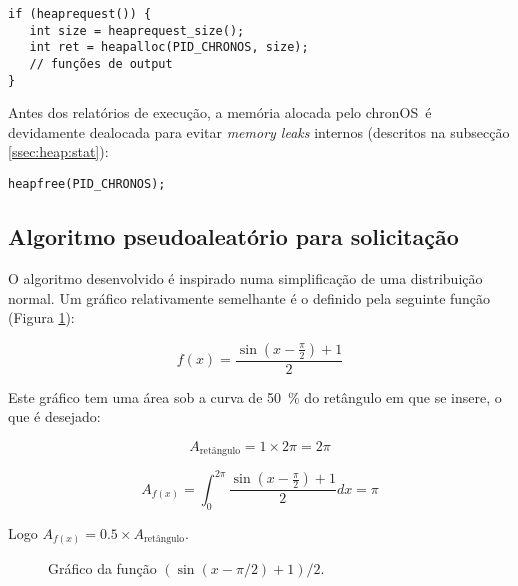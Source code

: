 \documentclass[10pt,oneside]{estiloUBI}
\newcommand{\chronOS}{\textsf{chronOS}}
\begin{document}
	\begin{verbatim}
if (heaprequest()) {
   int size = heaprequest_size();
   int ret = heapalloc(PID_CHRONOS, size);
   // funções de output
}
	\end{verbatim}
	
	Antes dos relatórios de execução, a memória alocada pelo \chronOS~é devidamente dealocada para evitar \textit{memory leaks} internos (descritos na subsecção \ref{ssec:heap:stat}):
	
	\begin{verbatim}
heapfree(PID_CHRONOS);
	\end{verbatim}
	
	
	\subsection{Algoritmo pseudoaleatório para solicitação}
	\label{sssec:heap:request:alg}
	
	O algoritmo desenvolvido é inspirado numa simplificação de uma distribuição normal. Um gráfico relativamente semelhante é o definido pela seguinte função (Figura \ref{graph:heap:request:alg}):
	
	\begin{equation}
f(x) = \frac{\sin\left(x - \frac{\pi}{2}\right) + 1}{2}
	\end{equation}
	
	Este gráfico tem uma área sob a curva de \SI{50}{\percent} do retângulo em que se insere, o que é desejado:
	
	\begin{displaymath}
		A_{\textrm{retângulo}} = 1 \times 2\pi = 2\pi
	\end{displaymath}
	
	\begin{displaymath}
		A_{f(x)} = \int_{0}^{2\pi} \frac{\sin\left(x - \frac{\pi}{2}\right) + 1}{2} dx = \pi
	\end{displaymath}
	
	Logo $A_{f(x)} = 0.5 \times A_{\textrm{retângulo}}$.
	
	\begin{figure}[!htbp]
		\centering
		\caption{Gráfico da função $\left(\sin\left(x - \pi / 2\right) + 1\right) / 2$.}
		\label{graph:heap:request:alg}
	\end{figure}
	
\end{document}

